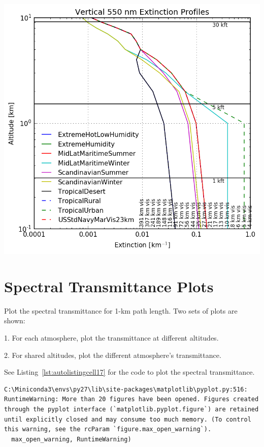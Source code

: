 \documentclass{workpackage}
\begin{document}
\begin{center}
\includegraphics{./pic/Analyse-Standard-Atmospheres_15_3.png}
\end{center}


\section{Spectral Transmittance Plots}
\label{sec:SpectralTransmittancePlots}

Plot the spectral transmittance for 1-km path length. Two sets of plots are shown: 


 1. For each atmosphere, plot the transmittance at different altitudes. 


 2. For shared altitudes, plot the different atmosphere's transmittance.




See Listing~\ref{lst:autolistingcell17} for the code to plot the spectral transmittance.


\begin{lstlisting}[style=outcellstyle]
C:\Miniconda3\envs\py27\lib\site-packages\matplotlib\pyplot.py:516: RuntimeWarning: More than 20 figures have been opened. Figures created through the pyplot interface (`matplotlib.pyplot.figure`) are retained until explicitly closed and may consume too much memory. (To control this warning, see the rcParam `figure.max_open_warning`).
  max_open_warning, RuntimeWarning)

\end{lstlisting}
\end{document}
